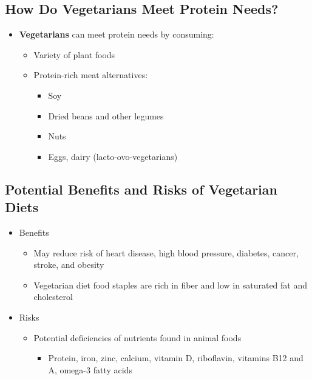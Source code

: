 \documentclass[12pt]{article}
\begin{document}
        \subsection{How Do Vegetarians Meet Protein Needs?}
            \begin{itemize}
                \item \textbf{Vegetarians} can meet protein needs by consuming:
                    \begin{itemize}
                        \item Variety of plant foods
                        \item Protein-rich meat alternatives:
                            \begin{itemize}
                                \item Soy
                                \item Dried beans and other legumes
                                \item Nuts
                                \item Eggs, dairy (lacto-ovo-vegetarians)
                            \end{itemize}
                    \end{itemize}
            \end{itemize}

        \subsection{Potential Benefits and Risks of Vegetarian Diets}
            \begin{itemize}
                \item Benefits
                    \begin{itemize}
                        \item May reduce risk of heart disease, high blood pressure, diabetes, cancer, stroke, and obesity
                        \item Vegetarian diet food staples are rich in fiber and low in saturated fat and cholesterol
                    \end{itemize}
                \item Risks
                    \begin{itemize}
                        \item Potential deficiencies of nutrients found in animal foods
                            \begin{itemize}
                                \item Protein, iron, zinc, calcium, vitamin D, riboflavin, vitamins B12 and A, omega-3 fatty acids
                            \end{itemize}
                    \end{itemize}
            \end{itemize}
\end{document}
